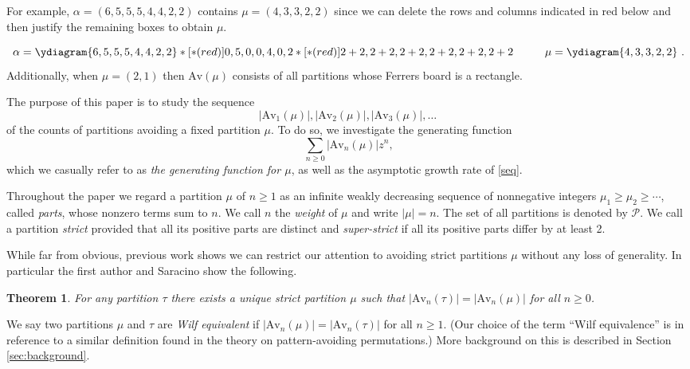 \documentclass{article}
\theoremstyle{plain}
\newtheorem{theorem}{Theorem}[section]
\theoremstyle{definition}
\newcommand{\Av}{\text{Av}}
\renewcommand{\P}{\mathcal{P}}
\begin{document}
For example, $\alpha = (6,5,5,5,4,4,2,2)$ contains $\mu=(4,3,3,2,2)$ since we can delete the rows and columns indicated in red below and then justify the remaining boxes to obtain $\mu$.  

$$\alpha=\ydiagram{6,5,5,5,4,4,2,2}*[*(red)]{0,5,0,0,4,0,2}*[*(red)]{2+2,2+2,2+2,2+2,2+2,2+2}\hspace{1cm} \mu = \ydiagram{4,3,3,2,2}  \ .$$
Additionally, when $\mu = (2,1)$ then $\Av(\mu)$ consists of all partitions whose Ferrers board is a rectangle.  

The purpose of this paper is to study the sequence 
\begin{equation}\label{seq}
|\Av_1(\mu)|, |\Av_2(\mu)|,|\Av_3(\mu)|,\ldots\ 
\end{equation}
of the counts of partitions avoiding a fixed partition $\mu$. To do so, we investigate the generating function
\begin{equation}\label{gf}
    \sum_{n\geq 0}|\Av_n(\mu)|z^n,
\end{equation}
which we casually refer to as \emph{the generating function for $\mu$}, as well as the asymptotic growth rate of \eqref{seq}. 


Throughout the paper we regard a partition $\mu$ of $n\geq 1$ as an infinite weakly decreasing sequence of nonnegative integers $\mu_1\geq \mu_2\geq \cdots$, called \emph{parts}, whose nonzero terms sum to $n$.    We call $n$ the \emph{weight} of $\mu$ and write $|\mu|=n$.  The set of all partitions is denoted by $\P$. We call a partition \emph{strict} provided that all its positive parts are distinct and \emph{super-strict} if all its positive parts differ by at least 2.


While far from obvious, previous work shows we can restrict our attention to avoiding strict partitions $\mu$ without any loss of generality. In particular the first author and Saracino show \cites{Bloom:Rook-2018,Bloom:On-cr2018} the following.

\begin{theorem}\label{thm:strict}
For any partition $\tau$ there exists a unique strict partition $\mu$ such that $|\Av_n(\tau)| = |\Av_n(\mu)|$ for all $n\geq 0$.
\end{theorem}
We say two partitions $\mu$ and $\tau$ are \emph{Wilf equivalent} if $|\Av_n(\mu)| = |\Av_n(\tau)|$ for all $n\geq 1$. (Our choice of the term ``Wilf equivalence'' is in reference to a similar definition found in the theory on pattern-avoiding permutations.)  More background on this is described in Section \ref{sec:background}.
\end{document}
